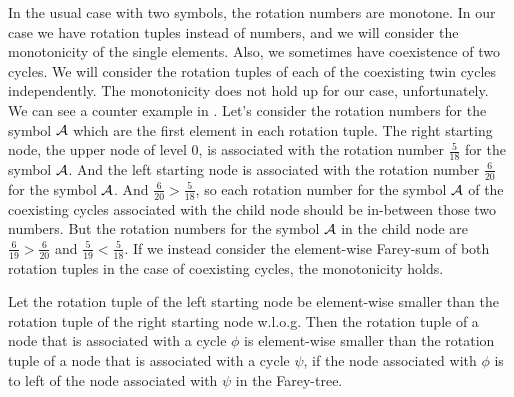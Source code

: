 In the usual case with two symbols, the rotation numbers are monotone.
In our case we have rotation tuples instead of numbers, and we will consider the monotonicity of the single elements.
Also, we sometimes have coexistence of two cycles.
We will consider the rotation tuples of each of the coexisting twin cycles independently.
The monotonicity does not hold up for our case, unfortunately.
We can see a counter example in .
Let's consider the rotation numbers for the symbol $\mathcal{A}$ which are the first element in each rotation tuple.
The right starting node, the upper node of level 0, is associated with the rotation number $\frac{5}{18}$ for the symbol $\mathcal{A}$.
And the left starting node is associated with the rotation number $\frac{6}{20}$ for the symbol $\mathcal{A}$.
And $\frac{6}{20} > \frac{5}{18}$, so each rotation number for the symbol $\mathcal{A}$ of the coexisting cycles associated with the child node should be in-between those two numbers.
But the rotation numbers for the symbol $\mathcal{A}$ in the child node are $\frac{6}{19} > \frac{6}{20}$ and $\frac{5}{19} < \frac{5}{18}$.
If we instead consider the element-wise Farey-sum of both rotation tuples in the case of coexisting cycles, the monotonicity holds.

\begin{theorem}
	\label{theorem:rotation.monotonicity}
	Let the rotation tuple of the left starting node be element-wise smaller than the rotation tuple of the right starting node w.l.o.g.
	Then the rotation tuple of a node that is associated with a cycle $\phi$ is element-wise smaller than the rotation tuple of a node that is associated with a cycle $\psi$,
	if the node associated with $\phi$ is to left of the node associated with $\psi$ in the Farey-tree.
\end{theorem}

